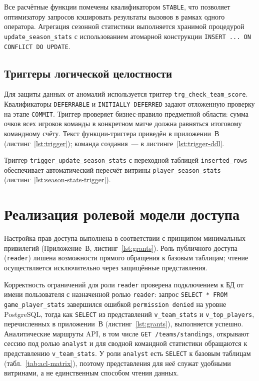 Все расчётные функции помечены квалификатором \texttt{STABLE}, что позволяет
оптимизатору запросов кэшировать результаты вызовов в рамках одного
оператора. Агрегация сезонной статистики выполняется
хранимой процедурой \texttt{update\_season\_stats} с использованием
атомарной конструкции \texttt{INSERT ... ON CONFLICT DO UPDATE}.

\subsection{Триггеры логической целостности}

Для защиты данных от аномалий используется триггер
\texttt{trg\_check\_team\_score}. Квалификаторы \texttt{DEFERRABLE} и
\texttt{INITIALLY DEFERRED} задают отложенную проверку на этапе
\texttt{COMMIT}. Триггер проверяет бизнес-правило предметной области:
сумма очков всех игроков команды в конкретном матче должна равняться
итоговому командному счёту. Текст функции-триггера приведён
в приложении~В (листинг~\ref{lst:trigger}); команда создания~---
в листинге~\ref{lst:trigger-ddl}.

Триггер \texttt{trigger\_update\_season\_stats} с переходной таблицей
\texttt{inserted\_rows} обеспечивает автоматический пересчёт витрины
\texttt{player\_season\_stats} (листинг~\ref{lst:season-stats-trigger}).

\section{Реализация ролевой модели доступа}

Настройка прав доступа выполнена в соответствии с
принципом минимальных привилегий (Приложение~В, листинг~\ref{lst:grants}).
Роль публичного доступа (\texttt{reader})
лишена возможности прямого обращения к базовым таблицам; чтение
осуществляется исключительно через защищённые представления.

Корректность ограничений для роли \texttt{reader} проверена подключением к БД
от имени пользователя с назначенной ролью \texttt{reader}: запрос \texttt{SELECT * FROM game\_player\_stats} завершился
ошибкой \texttt{permission denied} на уровне PostgreSQL, тогда как
\texttt{SELECT} из представлений \texttt{v\_team\_stats} и \texttt{v\_top\_players},
перечисленных в приложении~В (листинг~\ref{lst:grants}), выполняется успешно.
Аналитические маршруты API, в том числе \texttt{GET /teams/standings},
открывают сессию под ролью \texttt{analyst} и для сводной командной
статистики обращаются к представлению \texttt{v\_team\_stats}.
У роли \texttt{analyst} есть \texttt{SELECT} к базовым таблицам (табл.~\ref{tab:acl-matrix}),
поэтому представления для неё служат удобными витринами, а не единственным
способом чтения данных.

